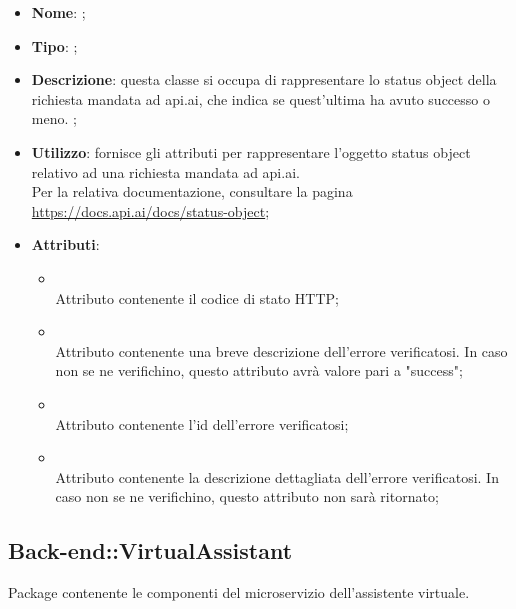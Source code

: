 \begin{itemize}
	\item \textbf{Nome}: ;
	\item \textbf{Tipo}: ;
	\item \textbf{Descrizione}: questa classe si occupa di rappresentare lo status object della richiesta mandata ad api.ai, che indica se quest'ultima ha avuto successo o meno.
;
	\item \textbf{Utilizzo}: fornisce gli attributi per rappresentare l'oggetto status object relativo ad una richiesta mandata ad api.ai. \\
Per la relativa documentazione, consultare la pagina \url{https://docs.api.ai/docs/status-object};
	\item \textbf{Attributi}:
	\begin{itemize}
		\item[]  \\
		Attributo contenente il codice di stato HTTP;
		\item[]  \\
		Attributo contenente una breve descrizione dell'errore verificatosi. In caso non se ne verifichino, questo attributo avrà valore pari a "success";
		\item[]  \\
		Attributo contenente l'id dell'errore verificatosi;
		\item[]  \\
		Attributo contenente la descrizione dettagliata dell'errore verificatosi. In caso non se ne verifichino, questo attributo non sarà ritornato;
	\end{itemize}
\end{itemize}

\subsection{Back-end::VirtualAssistant}
Package contenente le componenti del microservizio dell'assistente virtuale.
